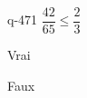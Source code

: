 \begin{truefalse}{q-471}
$\dfrac{42}{65} \leq \dfrac{2}{3}$
\item* Vrai
\item Faux
\end{truefalse}

